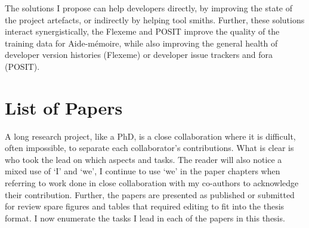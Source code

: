 The solutions I propose can help developers directly, by improving the state of
the project artefacts, or indirectly by helping tool smiths. Further, these
solutions interact synergistically, the Flexeme and POSIT improve the quality of
the training data for Aide-mémoire, while also improving the general health of
developer version histories (Flexeme) or developer issue trackers and fora
(POSIT).

\section{List of Papers}
\label{chapter:introduction:sec:papers}

A long research project, like a PhD, is a close collaboration where it is
difficult, often impossible, to separate each collaborator's contributions. What
is clear is who took the lead on which aspects and tasks. The reader will also
notice a mixed use of `I' and `we', I continue to use `we' in the paper chapters
when referring to work done in close collaboration with my co-authors to
acknowledge their contribution. Further, the papers are presented as published
or submitted for review spare figures and tables that required editing to fit
into the thesis format. I now enumerate the tasks I lead in each of the papers
in this thesis.

